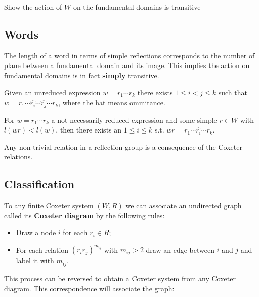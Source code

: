 \documentclass[../main.tex]{subfiles}
\begin{document}
Show the action of $W$ on the fundamental domains is transitive

\subsection{Words}

The length of a word in terms of simple reflections corresponds to the number of plane between a fundamental domain and its image. This implies the action on fundamental domains is in fact \textbf{simply} transitive.

\begin{proposition}
    Given an unreduced expression $w=r_1\cdots r_k$ there exists $1\leq i < j \leq k$ such that $w=r_1\cdots\hat{r_i}\cdots\hat{r_j}\cdots r_k$, where the hat means ommitance.
\end{proposition}

\begin{proposition}
    For $w=r_1\cdots r_k$ a not necessarily reduced expression and some simple $r\in W$ with $l(wr)<l(w)$, then there exists an $1\leq i\leq k$ s.t. $wr = r_1\cdots\hat{r_i}\cdots r_k$.
\end{proposition}

\begin{theorem}
    Any non-trivial relation in a reflection group is a consequence of the Coxeter relations.
\end{theorem}

\subsection{Classification}

To any finite Coxeter system $(W,R)$ we can associate an undirected graph called its \textbf{Coxeter diagram} by the following rules:\begin{itemize}
    \item Draw a node $i$ for each $r_i\in R$;
    \item For each relation $(r_i r_j)^{m_{ij}}$ with $m_{ij}>2$ draw an edge between $i$ and $j$ and label it with $m_{ij}$.
\end{itemize}

This process can be reversed to obtain a Coxeter system from any Coxeter diagram. This correspondence will associate the graph:
\begin{figure}[!h]
\centering
{}
\end{figure}
\end{document}
